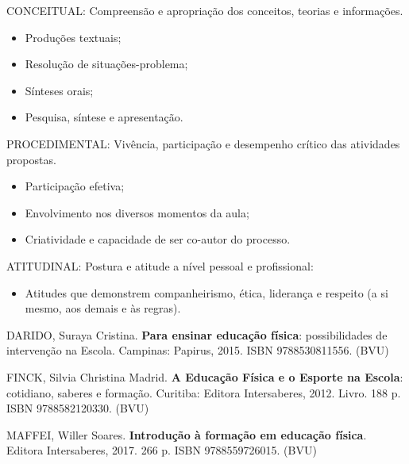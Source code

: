 \begin{pud}
	\avaliacao
	\begin{description}[itemsep=0em, topsep=0em]
		\vspace{-1em}
		\item CONCEITUAL: Compreensão e apropriação dos conceitos, teorias e informações. 
		\begin{itemize}
			\item  Produções textuais;
			\item  Resolução de situações-problema;
			\item   Sínteses orais;
			\item   Pesquisa, síntese e apresentação.
		\end{itemize}
		
		\item PROCEDIMENTAL: Vivência, participação e desempenho crítico das atividades propostas. 
		\begin{itemize}
			\item  Participação efetiva; 
			\item   Envolvimento nos diversos momentos da aula; 
			\item   Criatividade e capacidade de ser co-autor do processo.
		\end{itemize}
		
		\item ATITUDINAL: Postura e atitude a nível pessoal e profissional: 
		\begin{itemize}
			\item  Atitudes que demonstrem companheirismo, ética, liderança e respeito (a si mesmo, aos demais e às regras).
		\end{itemize}
		
	\end{description}
	
	
	\begin{bibbasica}
			
		\item DARIDO, Suraya Cristina. \textbf{Para ensinar educação física}: possibilidades de intervenção na Escola. Campinas: Papirus, 2015. ISBN 9788530811556. (BVU)
		\item FINCK, Silvia Christina Madrid. \textbf{A Educação Física e o Esporte na Escola}: cotidiano, saberes e formação.  Curitiba: Editora Intersaberes, 2012. Livro. 188 p. ISBN 9788582120330. (BVU)
		\item MAFFEI, Willer Soares. \textbf{Introdução à formação em educação física}. Editora Intersaberes, 2017. 266 p. ISBN 9788559726015. (BVU) 
	

\end{bibbasica}
\end{pud}
